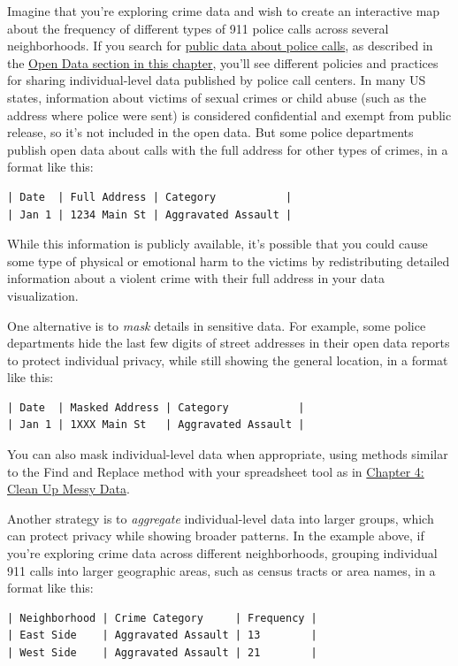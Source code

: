 \documentclass[
  english,
]{book}
\begin{document}
Imagine that you're exploring crime data and wish to create an interactive map about the frequency of different types of 911 police calls across several neighborhoods. If you search for \href{https://www.opendatanetwork.com/search?q=police}{public data about police calls}, as described in the \href{open-data.html}{Open Data section in this chapter}, you'll see different policies and practices for sharing individual-level data published by police call centers. In many US states, information about victims of sexual crimes or child abuse (such as the address where police were sent) is considered confidential and exempt from public release, so it's not included in the open data. But some police departments publish open data about calls with the full address for other types of crimes, in a format like this:

\begin{verbatim}
| Date  | Full Address | Category           |
| Jan 1 | 1234 Main St | Aggravated Assault |
\end{verbatim}

While this information is publicly available, it's possible that you could cause some type of physical or emotional harm to the victims by redistributing detailed information about a violent crime with their full address in your data visualization.

One alternative is to \emph{mask} details in sensitive data. For example, some police departments hide the last few digits of street addresses in their open data reports to protect individual privacy, while still showing the general location, in a format like this:

\begin{verbatim}
| Date  | Masked Address | Category           |
| Jan 1 | 1XXX Main St   | Aggravated Assault |
\end{verbatim}

You can also mask individual-level data when appropriate, using methods similar to the Find and Replace method with your spreadsheet tool as in \href{clean.html}{Chapter 4: Clean Up Messy Data}.

Another strategy is to \emph{aggregate} individual-level data into larger groups, which can protect privacy while showing broader patterns. In the example above, if you're exploring crime data across different neighborhoods, grouping individual 911 calls into larger geographic areas, such as census tracts or area names, in a format like this:

\begin{verbatim}
| Neighborhood | Crime Category     | Frequency |
| East Side    | Aggravated Assault | 13        |
| West Side    | Aggravated Assault | 21        |
\end{verbatim}
\end{document}
